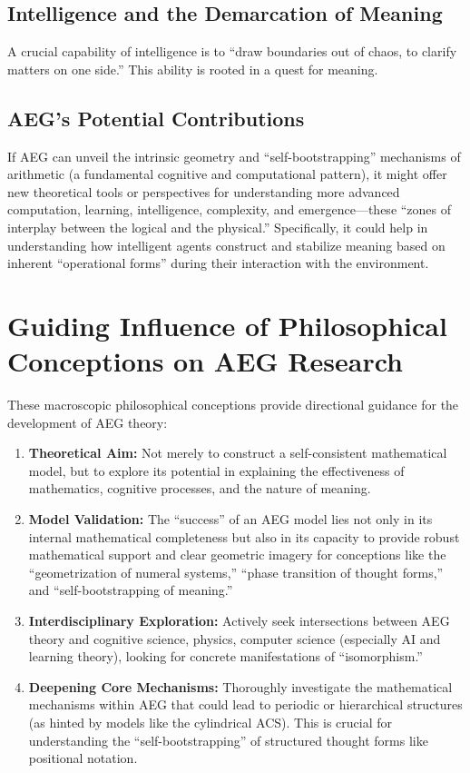 \documentclass{article}
\begin{document}
\subsection{Intelligence and the Demarcation of Meaning}
A crucial capability of intelligence is to ``draw boundaries out of chaos, to clarify matters on one side.'' This ability is rooted in a quest for meaning.

\subsection{AEG's Potential Contributions}
If AEG can unveil the intrinsic geometry and ``self-bootstrapping'' mechanisms of arithmetic (a fundamental cognitive and computational pattern), it might offer new theoretical tools or perspectives for understanding more advanced computation, learning, intelligence, complexity, and emergence—these ``zones of interplay between the logical and the physical.'' Specifically, it could help in understanding how intelligent agents construct and stabilize meaning based on inherent ``operational forms'' during their interaction with the environment.

\section{Guiding Influence of Philosophical Conceptions on AEG Research}

These macroscopic philosophical conceptions provide directional guidance for the development of AEG theory:
\begin{enumerate}
    \item \textbf{Theoretical Aim:} Not merely to construct a self-consistent mathematical model, but to explore its potential in explaining the effectiveness of mathematics, cognitive processes, and the nature of meaning.
    \item \textbf{Model Validation:} The ``success'' of an AEG model lies not only in its internal mathematical completeness but also in its capacity to provide robust mathematical support and clear geometric imagery for conceptions like the ``geometrization of numeral systems,'' ``phase transition of thought forms,'' and ``self-bootstrapping of meaning.''
    \item \textbf{Interdisciplinary Exploration:} Actively seek intersections between AEG theory and cognitive science, physics, computer science (especially AI and learning theory), looking for concrete manifestations of ``isomorphism.''
    \item \textbf{Deepening Core Mechanisms:} Thoroughly investigate the mathematical mechanisms within AEG that could lead to periodic or hierarchical structures (as hinted by models like the cylindrical ACS). This is crucial for understanding the ``self-bootstrapping'' of structured thought forms like positional notation.
\end{enumerate}
\end{document}
